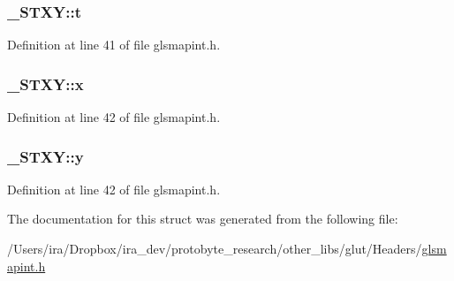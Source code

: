 \hypertarget{struct___s_t_x_y_a4abc729e77d41ab5a407b6b0b6ecb9d7}{
\subsubsection[{t}]{ \-\_\-\-S\-T\-X\-Y\-::t}}\label{struct___s_t_x_y_a4abc729e77d41ab5a407b6b0b6ecb9d7}


Definition at line 41 of file glsmapint.\-h.

\hypertarget{struct___s_t_x_y_a733147b5dc188e788b0903ba1bec7f7e}{
\subsubsection[{x}]{ \-\_\-\-S\-T\-X\-Y\-::x}}\label{struct___s_t_x_y_a733147b5dc188e788b0903ba1bec7f7e}


Definition at line 42 of file glsmapint.\-h.

\hypertarget{struct___s_t_x_y_a222822654dc08ad4e974daf39a8e4d7e}{
\subsubsection[{y}]{ \-\_\-\-S\-T\-X\-Y\-::y}}\label{struct___s_t_x_y_a222822654dc08ad4e974daf39a8e4d7e}


Definition at line 42 of file glsmapint.\-h.



The documentation for this struct was generated from the following file\-:\begin{DoxyCompactItemize}
\item 
/\-Users/ira/\-Dropbox/ira\-\_\-dev/protobyte\-\_\-research/other\-\_\-libs/glut/\-Headers/\hyperlink{glsmapint_8h}{glsmapint.\-h}\end{DoxyCompactItemize}
